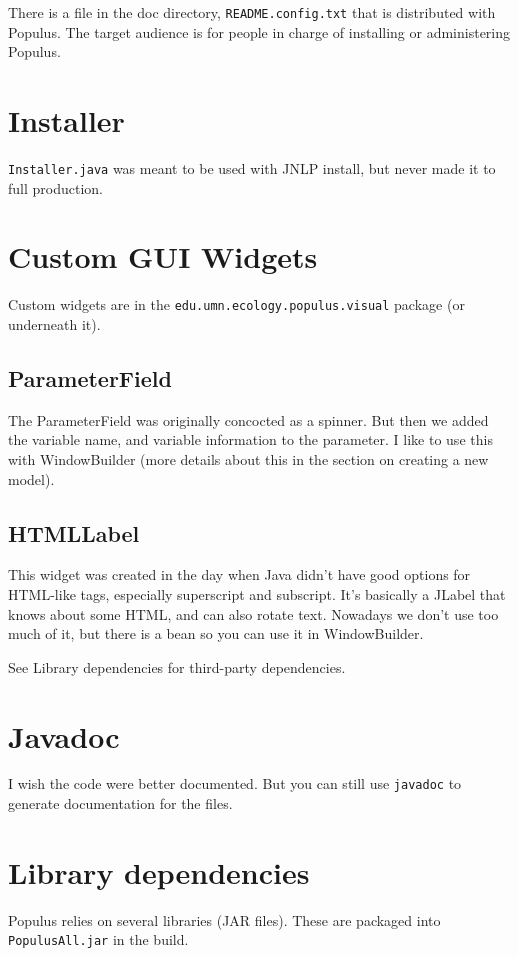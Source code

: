\documentclass[12pt]{article}
\begin{document}
There is a file in the doc directory, \texttt{README.config.txt} that is distributed with Populus.  The target audience is for people in charge of installing or administering Populus.

\section{Installer}
\texttt{Installer.java} was meant to be used with JNLP install, but never made it to full production.

\section{Custom GUI Widgets}

Custom widgets are in the \texttt{edu.umn.ecology.populus.visual} package (or underneath it).

\subsection{ParameterField}
The ParameterField was originally concocted as a spinner.  But then we added the variable name, and variable information to the parameter.  I like to use this with WindowBuilder (more details about this in the section on creating a new model).

\subsection{HTMLLabel}
This widget was created in the day when Java didn't have good options for HTML-like tags, especially superscript and subscript.  It's basically a JLabel that knows about some HTML, and can also rotate text.  Nowadays we don't use too much of it, but there is a bean so you can use it in WindowBuilder.

See Library dependencies for third-party dependencies.

\section{Javadoc}

I wish the code were better documented.  But you can still use \texttt{javadoc} to generate documentation for the files.

\section{Library dependencies}
Populus relies on several libraries (JAR files).  These are packaged into \texttt{PopulusAll.jar} in the build.
\end{document}
